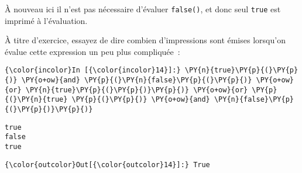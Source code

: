     À nouveau ici il n'est pas nécessaire d'évaluer \texttt{false()}, et
donc seul \texttt{true} est imprimé à l'évaluation.

    À titre d'exercice, essayez de dire combien d'impressions sont émises
lorsqu'on évalue cette expression un peu plus compliquée~:

    \begin{Verbatim}[commandchars=\\\{\},frame=single,framerule=0.3mm,rulecolor=\color{cellframecolor}]
{\color{incolor}In [{\color{incolor}14}]:} \PY{n}{true}\PY{p}{(}\PY{p}{)} \PY{o+ow}{and} \PY{p}{(}\PY{n}{false}\PY{p}{(}\PY{p}{)} \PY{o+ow}{or} \PY{n}{true}\PY{p}{(}\PY{p}{)}\PY{p}{)} \PY{o+ow}{or} \PY{p}{(}\PY{n}{true} \PY{p}{(}\PY{p}{)} \PY{o+ow}{and} \PY{n}{false}\PY{p}{(}\PY{p}{)}\PY{p}{)}
\end{Verbatim}


    \begin{Verbatim}[commandchars=\\\{\},frame=single,framerule=0.3mm,rulecolor=\color{cellframecolor}]
true
false
true
\end{Verbatim}

\begin{Verbatim}[commandchars=\\\{\},frame=single,framerule=0.3mm,rulecolor=\color{cellframecolor}]
{\color{outcolor}Out[{\color{outcolor}14}]:} True
\end{Verbatim}
            

    
    
    
